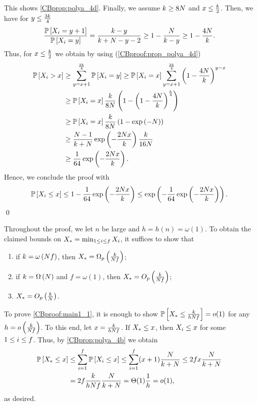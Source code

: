 This shows \ref{CBprop:polya_4d}. Finally, we assume $k\geq 8N$ and $x \leq \frac{k}{2}$. Then, we have for $y \leq \frac{3k}{4}$
\[\frac{\mathbb{P}\left[X_i=y+1\right]}{\mathbb{P}\left[X_i=y\right]}=\frac{k-y}{k+N-y-2}\geq 1-\frac{N}{k-y}\geq 1-\frac{4N}{k}.\]
Thus, for $x\leq \frac{k}{2}$ we obtain by using (\ref{CBproof:prop_polya_4d})
\begin{align*}
\mathbb{P}\left[X_i>x\right]&\geq\sum_{y=x+1}^{\frac{3k}{4}}\mathbb{P}\left[X_i=y\right]\geq \mathbb{P}\left[X_i=x\right]\sum_{y=x+1}^{\frac{3k}{4}}\left(1-\frac{4N}{k}\right)^{y-x}
\\
&\geq \mathbb{P}\left[X_i=x\right] \frac{k}{8N}\left(1-\left(1-\frac{4N}{k}\right)^{\frac{k}{4}}\right)
\\
&\geq \mathbb{P}\left[X_i=x\right] \frac{k}{8N} \left(1-\exp\left(-N\right)\right)
\\
&\geq \frac{N-1}{k+N}\exp\left(-\frac{2N x}{k}\right) \frac{k}{16N}
\\
&\geq
\frac{1}{64}\exp\left(-\frac{2N x}{k}\right).
\end{align*}
Hence, we conclude the proof with
\begin{align*}
\mathbb{P}\left[X_i\leq x\right]\leq 1-\frac{1}{64}\exp\left(-\frac{2N x}{k}\right)\leq \exp\left(-\frac{1}{64}\exp\left(-\frac{2N x}{k}\right)\right).
\end{align*}\qed

Throughout the proof, we let $n$ be large and $h=h(n)=\omega(1)$. To obtain the claimed bounds on ${X_*}=\min_{1\leq i \leq f}X_i$, it suffices to show that 
\begin{enumerate}[label={(\alph*)}]
	\item\label{CBproof:main1_1}
	if $k=\omega\left(N f\right)$, then ${X_*}=\Omega_p\left(\frac{k}{N f}\right)$;
	\item\label{CBproof:main1_2} 
	if $k=\Omega\left(N\right)$ and $f=\omega(1)$, then ${X_*}=O_p\left(\frac{k}{N f}\right)$;
	\item\label{CBproof:main1_3}
	${X_*}=O_p\left(\frac{k}{N}\right)$.	
\end{enumerate}

To prove \ref{CBproof:main1_1}, it is enough to show $\mathbb{P}\left[{X_*}\leq \frac{k}{hN f}\right] =o(1)$ for any $h=o\left(\frac{k}{N f}\right)$. To this end, let $x=\frac{k}{hN f}$. If ${X_*} \leq x$, then $X_i \leq x$ for some $1\leq i \leq f$. Thus, by \ref{CBprop:polya_4b} we obtain
\begin{align*}
\mathbb{P}\left[{X_*}\leq x\right]&\leq \sum_{i=1}^{f}\mathbb{P}\left[X_i\leq x\right]
\leq \sum_{i=1}^{f} (x+1) \frac{N}{k+N} 
\leq 2f x \frac{N}{k+N} 
\\
&=2f\frac{k}{hN f}\frac{N}{k+N}
= \Theta(1)\frac{1}{ h} =o(1),
\end{align*}
as desired.

